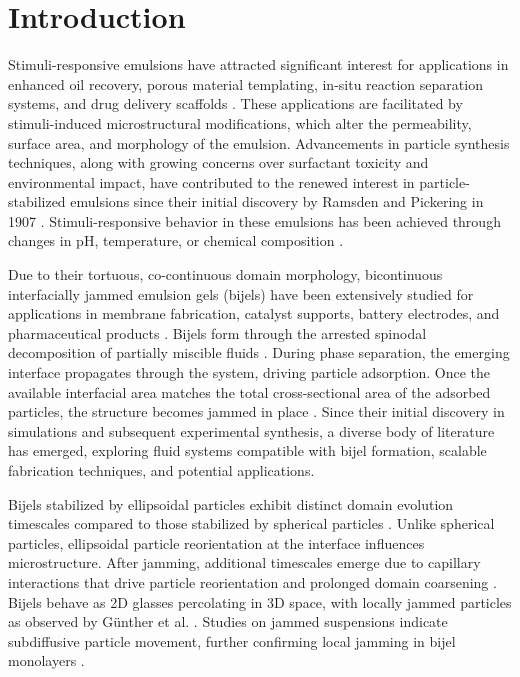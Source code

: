 \section{Introduction}

Stimuli-responsive emulsions have attracted significant interest for applications in enhanced oil recovery, porous material templating, 
in-situ reaction separation systems, and drug delivery scaffolds \cite{tang_stimuli-responsive_2016, bago_rodriguez_capsules_2019}. 
These applications are facilitated by stimuli-induced microstructural modifications, which alter the permeability, surface area, and 
morphology of the emulsion. Advancements in particle synthesis techniques, along with growing concerns over surfactant toxicity and 
environmental impact, have contributed to the renewed interest in particle-stabilized emulsions since their initial discovery by Ramsden 
and Pickering in 1907 \cite{rozynek_opening_2019, zhou_magnetic_2011}. Stimuli-responsive behavior in these emulsions has been achieved 
through changes in pH, temperature, or chemical composition 
\cite{maingret_dextran-based_2020, lin_ph-responsive_2018, raju_ph-responsive_2018, zhang_ph_2022}.  

Due to their tortuous, co-continuous domain morphology, bicontinuous interfacially jammed emulsion gels (bijels) have been 
extensively studied for applications in membrane fabrication, catalyst supports, battery electrodes, and pharmaceutical 
products \cite{yabuno_preparation_2020, samdani_bicontinuous_2017, cha_bicontinuous_2019, garcia_scalable_2019, santiago_cordoba_aerobijels_2020}.  
Bijels form through the arrested spinodal decomposition of partially miscible fluids 
\cite{stratford_colloidal_2005, herzig_bicontinuous_2007, tavacoli_novel_2011}. During phase separation, the emerging interface propagates 
through the system, driving particle adsorption. Once the available interfacial area matches the total cross-sectional area of the adsorbed 
particles, the structure becomes jammed in place \cite{stratford_colloidal_2005, herzig_bicontinuous_2007, tavacoli_novel_2011}. Since their 
initial discovery in simulations and subsequent experimental synthesis, a diverse body of literature has emerged, exploring fluid systems 
compatible with bijel formation, scalable fabrication techniques, and potential applications.

Bijels stabilized by ellipsoidal particles exhibit distinct domain evolution timescales compared to those stabilized by 
spherical particles \cite{gunther_timescales_2014}. Unlike spherical particles, ellipsoidal particle reorientation at the 
interface influences microstructure. After jamming, additional timescales emerge due to capillary interactions that drive 
particle reorientation and prolonged domain coarsening \cite{gunther_timescales_2014}. Bijels behave as 2D glasses percolating 
in 3D space, with locally jammed particles as observed by Günther et al. 
\cite{ching_bijel_2022, torquato_jammed_2010, gunther_timescales_2014}. Studies on jammed suspensions indicate subdiffusive 
particle movement, further confirming local jamming in bijel monolayers \cite{savelev_diffusion_2006}.

